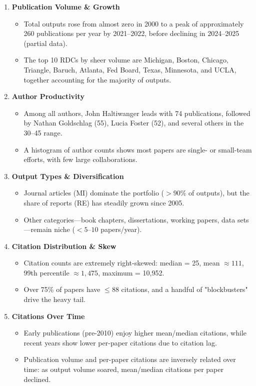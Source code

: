 \documentclass[12pt]{article}
\begin{document}
\begin{enumerate}
  \item \textbf{Publication Volume \& Growth}
    \begin{itemize}
      \item Total outputs rose from almost zero in 2000 to a peak of approximately 260 publications per year by 2021–2022, before declining in 2024–2025 (partial data).
      \item The top 10 RDCs by sheer volume are Michigan, Boston, Chicago, Triangle, Baruch, Atlanta, Fed Board, Texas, Minnesota, and UCLA, together accounting for the majority of outputs.
    \end{itemize}

  \item \textbf{Author Productivity}
    \begin{itemize}
      \item Among all authors, John Haltiwanger leads with 74 publications, followed by Nathan Goldschlag (55), Lucia Foster (52), and several others in the 30–45 range.
      \item A histogram of author counts shows most papers are single- or small-team efforts, with few large collaborations.
    \end{itemize}

  \item \textbf{Output Types \& Diversification}
    \begin{itemize}
      \item Journal articles (MI) dominate the portfolio (\(>90\%\) of outputs), but the share of reports (RE) has steadily grown since 2005.
      \item Other categories—book chapters, dissertations, working papers, data sets—remain niche (\(<5\text{--}10\) papers/year).
    \end{itemize}

  \item \textbf{Citation Distribution \& Skew}
    \begin{itemize}
      \item Citation counts are extremely right-skewed: median = 25, mean \(\approx 111\), 99th percentile \(\approx 1{,}475\), maximum = 10{,}952.
      \item Over 75\% of papers have \(\le88\) citations, and a handful of "blockbusters" drive the heavy tail.
    \end{itemize}

  \item \textbf{Citations Over Time}
    \begin{itemize}
      \item Early publications (pre-2010) enjoy higher mean/median citations, while recent years show lower per-paper citations due to citation lag.
      \item Publication volume and per-paper citations are inversely related over time: as output volume soared, mean/median citations per paper declined.
    \end{itemize}


\end{enumerate}
\end{document}
